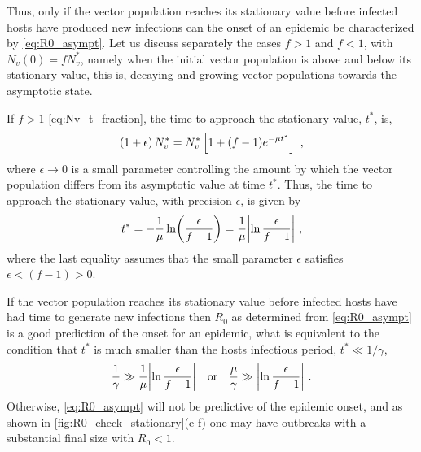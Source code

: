 Thus, only if the vector population reaches its stationary value before
infected hosts have produced new infections can the onset of an epidemic be
characterized by \cref{eq:R0_asympt}. Let us discuss separately the cases $f>1$
and $f<1$, with $N_v(0)=fN_v^*$, namely when the initial vector population is
above and below its stationary value, this is, decaying and growing vector
populations towards the asymptotic state.

If $f>1$ \cref{eq:Nv_t_fraction}, the time to approach the stationary
value, $t^*$, is,
\begin{equation}
    \left(1+\epsilon\right)N_v^*=N_v^*\left[1+(f-1)e^{-\mu t^*}\right] \ ,
\end{equation}
where $\epsilon\to 0$ is a small parameter controlling the amount by which
the vector population differs from its asymptotic value at time $t^*$. Thus,
the time to approach the stationary value, with precision $\epsilon$, is given
by
\begin{equation}
    t^*=-\frac{1}{\mu}\ln(\frac{\epsilon}{f-1})=
    \frac{1}{\mu}\abs{\ln{\frac{\epsilon}{f-1}}}
    \ ,
\end{equation}
where the last equality assumes that the small parameter $\epsilon$
satisfies $\epsilon<(f-1)>0$.

If the vector population reaches its stationary value before infected hosts
have had time to generate new infections then $R_0$ as determined from
\cref{eq:R0_asympt} is a good prediction of the onset for an epidemic, what is
equivalent to the condition that $t^*$ is much smaller than the hosts
infectious period, $t^*\ll1/\gamma$,
\begin{equation}\label{eq:timescales_condition}
    \frac{1}{\gamma} \gg \frac{1}{\mu}\abs{\ln{\frac{\epsilon}{f-1}}} \quad
    \textrm{or} \quad \frac{\mu}{\gamma}\gg\abs{\ln{\frac{\epsilon}{f-1}}}
    \ .
\end{equation}
Otherwise, \cref{eq:R0_asympt} will not be predictive of the epidemic
onset, and as shown in \cref{fig:R0_check_stationary}(e-f) one may have
outbreaks with a substantial final size with $R_0<1$.\\

